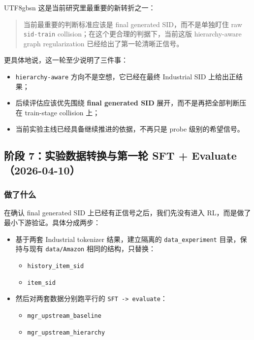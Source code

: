 \documentclass[11pt]{article}
\begin{document}
\begin{CJK*}{UTF8}{gbsn}
这是当前研究里最重要的新转折之一：

\begin{quote}
当前最重要的判断标准应该是 final generated SID，而不是单独盯住 raw \texttt{sid-train} collision；在这个更合理的判据下，当前这版 hierarchy-aware graph regularization 已经给出了第一轮清晰正信号。
\end{quote}

更具体地说，这一轮至少说明了三件事：

\begin{itemize}
  \item \texttt{hierarchy-aware} 方向不是空想，它已经在最终 Industrial SID 上给出正结果；
  \item 后续评估应该优先围绕 \textbf{final generated SID} 展开，而不是再把全部判断压在 train-stage collision 上；
  \item 当前实验主线已经具备继续推进的依据，不再只是 probe 级别的希望信号。
\end{itemize}

\subsection{阶段 7：实验数据转换与第一轮 SFT + Evaluate（2026-04-10）}

\subsubsection*{做了什么}

在确认 final generated SID 上已经有正信号之后，我们先没有进入 RL，而是做了最小下游验证。具体分成两步：

\begin{itemize}
  \item 基于两套 Industrial tokenizer 结果，建立隔离的 \texttt{data\_experiment} 目录，保持与现有 \texttt{data/Amazon} 相同的结构，只替换：
  \begin{itemize}
    \item \texttt{history\_item\_sid}
    \item \texttt{item\_sid}
  \end{itemize}
  \item 然后对两套数据分别跑平行的 \texttt{SFT -> evaluate}：
  \begin{itemize}
    \item \texttt{mgr\_upstream\_baseline}
    \item \texttt{mgr\_upstream\_hierarchy}
  \end{itemize}
\end{itemize}


\end{CJK*}
\end{document}
